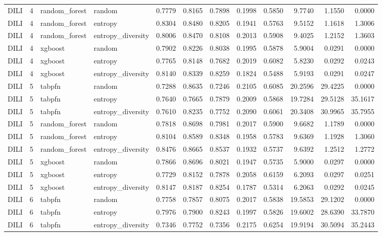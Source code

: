 \begin{tabular}{lrllrrrrrrrr}
DILI & 4 & random_forest & random & 0.7779 & 0.8165 & 0.7898 & 0.1998 & 0.5850 & 9.7740 & 1.1550 & 0.0000 \\
DILI & 4 & random_forest & entropy & 0.8304 & 0.8480 & 0.8205 & 0.1941 & 0.5763 & 9.5152 & 1.1618 & 1.3006 \\
DILI & 4 & random_forest & entropy_diversity & 0.8006 & 0.8470 & 0.8108 & 0.2013 & 0.5908 & 9.4025 & 1.2152 & 1.3603 \\
DILI & 4 & xgboost & random & 0.7902 & 0.8226 & 0.8038 & 0.1995 & 0.5878 & 5.9004 & 0.0291 & 0.0000 \\
DILI & 4 & xgboost & entropy & 0.7765 & 0.8148 & 0.7682 & 0.2019 & 0.6082 & 5.8230 & 0.0292 & 0.0243 \\
DILI & 4 & xgboost & entropy_diversity & 0.8140 & 0.8339 & 0.8259 & 0.1824 & 0.5488 & 5.9193 & 0.0291 & 0.0247 \\
DILI & 5 & tabpfn & random & 0.7288 & 0.8635 & 0.7246 & 0.2105 & 0.6085 & 20.2596 & 29.4225 & 0.0000 \\
DILI & 5 & tabpfn & entropy & 0.7640 & 0.7665 & 0.7879 & 0.2009 & 0.5868 & 19.7284 & 29.5128 & 35.1617 \\
DILI & 5 & tabpfn & entropy_diversity & 0.7610 & 0.8235 & 0.7752 & 0.2090 & 0.6061 & 20.3408 & 30.9965 & 35.7955 \\
DILI & 5 & random_forest & random & 0.7818 & 0.8698 & 0.7981 & 0.2017 & 0.5900 & 9.6682 & 1.1789 & 0.0000 \\
DILI & 5 & random_forest & entropy & 0.8104 & 0.8589 & 0.8348 & 0.1958 & 0.5783 & 9.6369 & 1.1928 & 1.3060 \\
DILI & 5 & random_forest & entropy_diversity & 0.8476 & 0.8665 & 0.8537 & 0.1932 & 0.5737 & 9.6392 & 1.2512 & 1.2772 \\
DILI & 5 & xgboost & random & 0.7866 & 0.8696 & 0.8021 & 0.1947 & 0.5735 & 5.9000 & 0.0297 & 0.0000 \\
DILI & 5 & xgboost & entropy & 0.7729 & 0.8152 & 0.7878 & 0.2058 & 0.6159 & 6.2093 & 0.0297 & 0.0251 \\
DILI & 5 & xgboost & entropy_diversity & 0.8147 & 0.8187 & 0.8254 & 0.1787 & 0.5314 & 6.2063 & 0.0292 & 0.0245 \\
DILI & 6 & tabpfn & random & 0.7758 & 0.7857 & 0.8075 & 0.2017 & 0.5838 & 19.5853 & 29.1202 & 0.0000 \\
DILI & 6 & tabpfn & entropy & 0.7976 & 0.7900 & 0.8243 & 0.1997 & 0.5826 & 19.6002 & 28.6390 & 33.7870 \\
DILI & 6 & tabpfn & entropy_diversity & 0.7346 & 0.7752 & 0.7356 & 0.2175 & 0.6254 & 19.9194 & 30.5094 & 35.2443 \\

\end{tabular}
